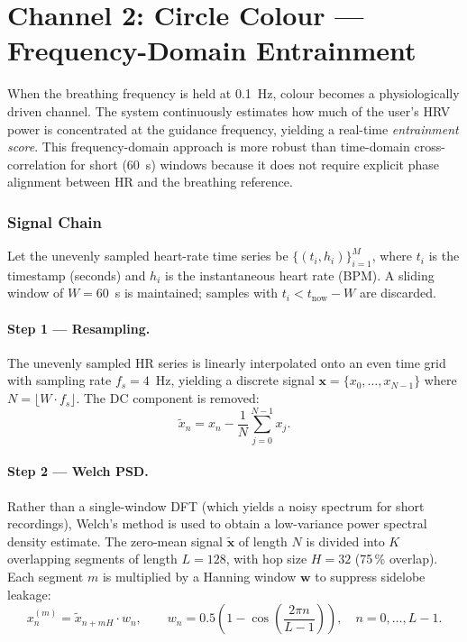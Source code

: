 \documentclass[11pt,a4paper]{article}
\begin{document}
\section{Channel 2: Circle Colour — Frequency-Domain Entrainment}

When the breathing frequency is held at 0.1~Hz, colour becomes a
physiologically driven channel. The system continuously estimates how much
of the user's HRV power is concentrated at the guidance frequency, yielding a
real-time \textit{entrainment score}. This frequency-domain approach is more
robust than time-domain cross-correlation for short (60~s) windows because it
does not require explicit phase alignment between HR and the breathing
reference.

\subsubsection{Signal Chain}

Let the unevenly sampled heart-rate time series be
$\{(t_i, h_i)\}_{i=1}^{M}$, where $t_i$ is the timestamp (seconds) and $h_i$
is the instantaneous heart rate (BPM). A sliding window of $W = 60$~s is
maintained; samples with $t_i < t_{\text{now}} - W$ are discarded.

\paragraph{Step 1 — Resampling.}
The unevenly sampled HR series is linearly interpolated onto an even time grid
with sampling rate $f_s = 4$~Hz, yielding a discrete signal
$\mathbf{x} = \{x_0, \dots, x_{N-1}\}$ where $N = \lfloor W \cdot f_s \rfloor$.
The DC component is removed:
\[
\tilde{x}_n = x_n - \frac{1}{N}\sum_{j=0}^{N-1} x_j.
\]

\paragraph{Step 2 — Welch PSD.}
Rather than a single-window DFT (which yields a noisy spectrum for short
recordings), Welch's method is used to obtain a low-variance power spectral
density estimate. The zero-mean signal $\tilde{\mathbf{x}}$ of length $N$ is
divided into $K$ overlapping segments of length $L = 128$, with hop size
$H = 32$ (75\,\% overlap). Each segment $m$ is multiplied by a Hanning window
$\mathbf{w}$ to suppress sidelobe leakage:
\[
x_n^{(m)} = \tilde{x}_{n + mH} \cdot w_n, \qquad
w_n = 0.5\left(1 - \cos\!\left(\frac{2\pi n}{L-1}\right)\right), \quad n = 0, \dots, L-1.
\]
\end{document}
